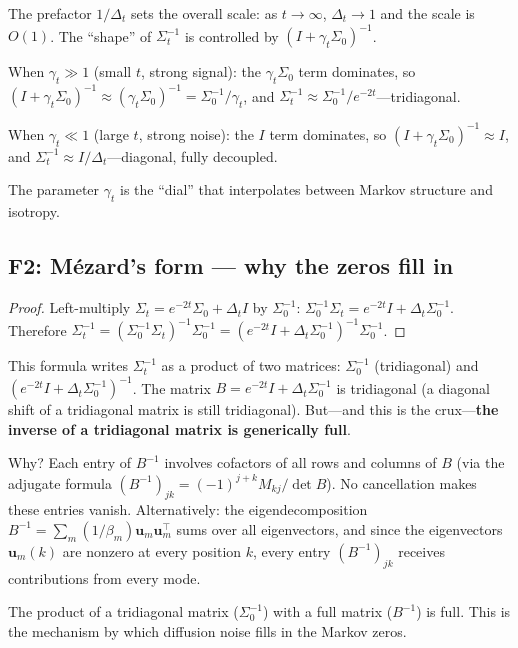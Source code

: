 \documentclass[11pt,a4paper]{article}
\theoremstyle{definition}
\newcommand{\Dt}{\Delta_t}
\begin{document}
\begin{intbox}
The prefactor $1/\Dt$ sets the overall scale: as $t \to \infty$, $\Dt \to 1$ and the scale is $O(1)$.
The ``shape'' of $\Sigma_t^{-1}$ is controlled by $(I + \gamma_t\Sigma_0)^{-1}$.

When $\gamma_t \gg 1$ (small $t$, strong signal): the $\gamma_t\Sigma_0$ term dominates, so $(I + \gamma_t\Sigma_0)^{-1} \approx (\gamma_t\Sigma_0)^{-1} = \Sigma_0^{-1}/\gamma_t$, and $\Sigma_t^{-1} \approx \Sigma_0^{-1}/e^{-2t}$---tridiagonal.

When $\gamma_t \ll 1$ (large $t$, strong noise): the $I$ term dominates, so $(I + \gamma_t\Sigma_0)^{-1} \approx I$, and $\Sigma_t^{-1} \approx I/\Dt$---diagonal, fully decoupled.

The parameter $\gamma_t$ is the ``dial'' that interpolates between Markov structure and isotropy.
\end{intbox}


\subsection{F2: M\'ezard's form --- why the zeros fill in}

\begin{proof}
Left-multiply $\Sigma_t = e^{-2t}\Sigma_0 + \Dt I$ by $\Sigma_0^{-1}$:
$\Sigma_0^{-1}\Sigma_t = e^{-2t}I + \Dt\Sigma_0^{-1}$.
Therefore $\Sigma_t^{-1} = (\Sigma_0^{-1}\Sigma_t)^{-1}\Sigma_0^{-1} = (e^{-2t}I + \Dt\Sigma_0^{-1})^{-1}\Sigma_0^{-1}$.
\end{proof}

\begin{intbox}
This formula writes $\Sigma_t^{-1}$ as a product of two matrices: $\Sigma_0^{-1}$ (tridiagonal) and $(e^{-2t}I + \Dt\Sigma_0^{-1})^{-1}$.
The matrix $B = e^{-2t}I + \Dt\Sigma_0^{-1}$ is tridiagonal (a diagonal shift of a tridiagonal matrix is still tridiagonal).
But---and this is the crux---\textbf{the inverse of a tridiagonal matrix is generically full}.

Why?
Each entry of $B^{-1}$ involves cofactors of all rows and columns of $B$ (via the adjugate formula $(B^{-1})_{jk} = (-1)^{j+k}M_{kj}/\det B$).
No cancellation makes these entries vanish.
Alternatively: the eigendecomposition $B^{-1} = \sum_m (1/\beta_m)\mathbf{u}_m\mathbf{u}_m^\top$ sums over all eigenvectors, and since the eigenvectors $\mathbf{u}_m(k)$ are nonzero at every position $k$, every entry $(B^{-1})_{jk}$ receives contributions from every mode.

The product of a tridiagonal matrix ($\Sigma_0^{-1}$) with a full matrix ($B^{-1}$) is full.
This is the mechanism by which diffusion noise fills in the Markov zeros.
\end{intbox}
\end{document}
